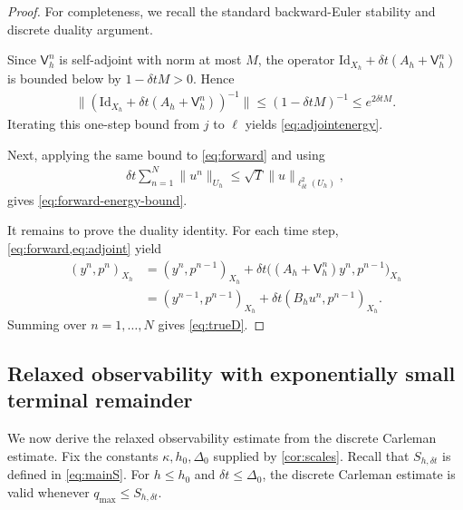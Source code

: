 \documentclass[print,wide,eng]{draft}
\begin{document}
\begin{proof}
For completeness, we recall the standard backward-Euler stability and discrete duality argument.

Since $\mathsf V_h^n$ is self-adjoint with norm at most $M$, the operator
$\mathrm{Id}_{X_h}+\delta t(A_h+\mathsf V_h^n)$ is bounded below by
$1-\delta t M>0$. Hence
%
\begin{align*}
\|(\mathrm{Id}_{X_h}+\delta t(A_h+\mathsf V_h^n))^{-1}\|
\le (1-\delta t M)^{-1}
\le e^{2\delta t M}.
\end{align*}
%
Iterating this one-step bound from $j$ to $\ell$ yields \cref{eq:adjointenergy}.

Next, applying the same bound to \cref{eq:forward} and using
%
\begin{align*}
\delta t\sum_{n=1}^N\|u^n\|_{U_h}
\le\sqrt T\|u\|_{\ell_{\delta t}^2(U_h)},
\end{align*}
%
gives \cref{eq:forward-energy-bound}.

It remains to prove the duality identity. For each time step, \cref{eq:forward,eq:adjoint} yield
%
\begin{align*}
(y^n,p^n)_{X_h}
&=(y^n,p^{n-1})_{X_h}
+\delta t\bigl((A_h+\mathsf V_h^n)y^n,p^{n-1}\bigr)_{X_h}\\
&=(y^{n-1},p^{n-1})_{X_h}
+\delta t(B_hu^n,p^{n-1})_{X_h}.
\end{align*}
%
Summing over $n=1,\ldots,N$ gives \cref{eq:trueD}.
\end{proof}
%

\subsection{Relaxed observability with exponentially small terminal remainder}\label{sec:observability}

We now derive the relaxed observability estimate from the discrete Carleman estimate. Fix the constants $\kappa,h_0,\Delta_0$ supplied by \cref{cor:scales}. Recall that $S_{h,{\delta t}}$ is defined in \cref{eq:mainS}. For $h\leq h_0$ and ${\delta t}\leq \Delta_0$, the discrete Carleman estimate is valid whenever $q_{\max}\leq S_{h,{\delta t}}$.
\end{document}

